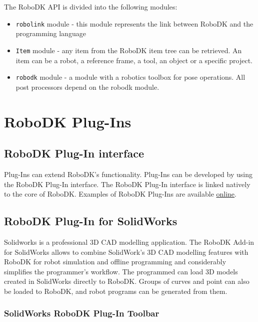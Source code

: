 The RoboDK API is divided into the following modules:


\begin{itemize}
    \item \texttt{robolink} module - this module represents the link between RoboDK and the programming language
    \item \texttt{Item} module - any item from the RoboDK item tree can be retrieved.  An item can be a robot, a reference frame, a tool, an object or a specific project.
    \item \texttt{robodk} module - a module with a robotics toolbox for pose operations. All post processors depend on the robodk module.
\end{itemize}

\section{RoboDK Plug-Ins}

\subsection{RoboDK Plug-In interface}

Plug-Ins can extend RoboDK's functionality. Plug-Ins can be developed by using the RoboDK Plug-In interface. The RoboDK Plug-In interface is linked natively to the core of RoboDK. Examples of RoboDK Plug-Ins are available \href{https://github.com/RoboDK/Plug-In-Interface}{online}. 

\subsection{RoboDK Plug-In for SolidWorks}



Solidworks is a professional 3D CAD modelling application. The RoboDK Add-in for SolidWorks allows to combine SolidWork's 3D CAD modelling features with RoboDK for robot simulation and offline programming and considerably simplifies the programmer's workflow. The programmed can load 3D models created in SolidWorks directly to RoboDK. Groups of curves and point can also be loaded to RoboDK, and robot programs can be generated from them.

\subsubsection*{SolidWorks RoboDK Plug-In Toolbar}

